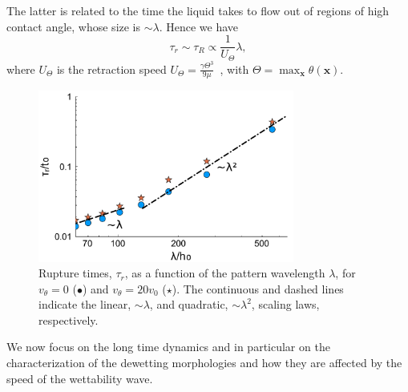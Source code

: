 The latter is related to the time the liquid takes to flow out of regions of high contact angle, whose size is $\sim \lambda$. 
Hence we have 
\begin{equation}\label{eq:taur_l1}
 \tau_r \sim \tau_R \propto \frac{1}{U_{\Theta}}\lambda,
\end{equation}
where $U_{\Theta}$ is the retraction speed $U_{\Theta} = \frac{\gamma \Theta^3}{9\mu}$~\cite{edwardsNotSpreadingReverse2016}, with $\Theta = \max_{\mathbf{x}}\theta(\mathbf{x})$.
\begin{figure}
    \centering
    \includegraphics[width=0.75\textwidth]{graphics/Figure_2.pdf}
    \caption{Rupture times, $\tau_r$, as a function of the pattern wavelength $\lambda$, for $v_{\theta}=0$ (\textcolor{jlblue}{$\bullet$}) and $v_{\theta}=20 v_0$ (\textcolor{jlorange}{$\star$}).
    The continuous and dashed lines indicate the linear, $\sim \lambda$, and quadratic, $\sim \lambda^2$, scaling laws, respectively.}
    \label{fig:model_rt}
\end{figure}
We now focus on the long time dynamics and in particular on the characterization of the dewetting morphologies and how they are affected by the speed of the wettability wave.
